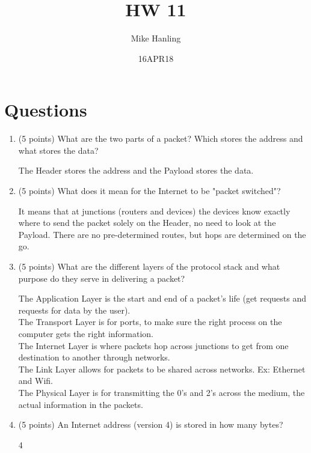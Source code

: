 \documentclass{article}[9pt]
\title{HW 11}
\author{Mike Hanling}
\date{16APR18}
\newenvironment{myanswer}{\begin{mdframed}\begin{answerfont}}{\end{answerfont}\end{mdframed}}
\begin{document}
\maketitle
\section*{Questions}
\label{sec:orgfce6862}
\begin{enumerate}


\item (5 points) What are the two parts of a packet? Which stores the address and
what stores the data?
\begin{myanswer}
The Header stores the address and the Payload stores the data.
\end{myanswer}

\item (5 points) What does it mean for the Internet to be "packet switched"?
\begin{myanswer}
It means that at junctions (routers and devices) the devices know
exactly where to send the packet solely on the Header, no need to look
at the Payload. There are no pre-determined routes, but hops are
determined on the go.
\end{myanswer}

\item (5 points) What are the different layers of the protocol stack and what
purpose do they serve in delivering a packet?
\begin{myanswer}
The Application Layer is the start and end of a packet's life (get
requests and requests for data by the user).\\
The Transport Layer is for ports, to make sure the right process on the
computer gets the right information.\\
The Internet Layer is where packets hop across junctions to get from one
destination to another through networks.\\
The Link Layer allows for packets to be shared across networks. Ex:
Ethernet and Wifi.\\
The Physical Layer is for transmitting the 0's and 2's across the
medium, the actual information in the packets.
\end{myanswer}

\item (5 points) An Internet address (version 4) is stored in how many bytes?
\begin{myanswer}
4
\end{myanswer}


\end{enumerate}
\end{document}
